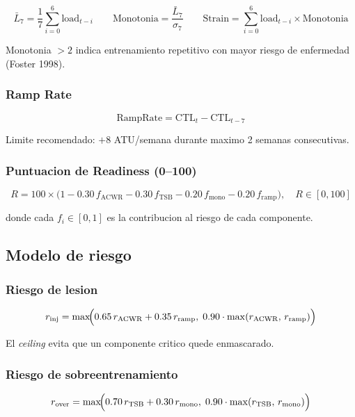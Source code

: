 \documentclass[12pt, a4paper]{article}
\begin{document}
\[
  \bar{L}_{7} = \frac{1}{7} \sum_{i=0}^{6} \text{load}_{t-i}
  \qquad
  \text{Monotonia} = \frac{\bar{L}_{7}}{\sigma_{7}}
  \qquad
  \text{Strain} = \sum_{i=0}^{6} \text{load}_{t-i} \times \text{Monotonia}
\]

Monotonia $> 2$ indica entrenamiento repetitivo con mayor riesgo de enfermedad (Foster 1998).

\subsubsection{Ramp Rate}

\[
  \text{RampRate} = \text{CTL}_{t} - \text{CTL}_{t-7}
\]

Limite recomendado: $+8$ ATU/semana durante maximo 2 semanas consecutivas.

\subsubsection{Puntuacion de Readiness (0--100)}

\[
  R = 100 \times \bigl(1
    - 0.30\,f_{\text{ACWR}}
    - 0.30\,f_{\text{TSB}}
    - 0.20\,f_{\text{mono}}
    - 0.20\,f_{\text{ramp}}
  \bigr), \quad R \in [0, 100]
\]

donde cada $f_i \in [0,1]$ es la contribucion al riesgo de cada componente.

\subsection{Modelo de riesgo}

\subsubsection{Riesgo de lesion}

\[
  r_{\text{inj}} = \max\!\Bigl(
    0.65\,r_{\text{ACWR}} + 0.35\,r_{\text{ramp}},\;
    0.90 \cdot \max(r_{\text{ACWR}},\, r_{\text{ramp}})
  \Bigr)
\]

El \emph{ceiling} evita que un componente critico quede enmascarado.

\subsubsection{Riesgo de sobreentrenamiento}

\[
  r_{\text{over}} = \max\!\Bigl(
    0.70\,r_{\text{TSB}} + 0.30\,r_{\text{mono}},\;
    0.90 \cdot \max(r_{\text{TSB}},\, r_{\text{mono}})
  \Bigr)
\]
\end{document}
